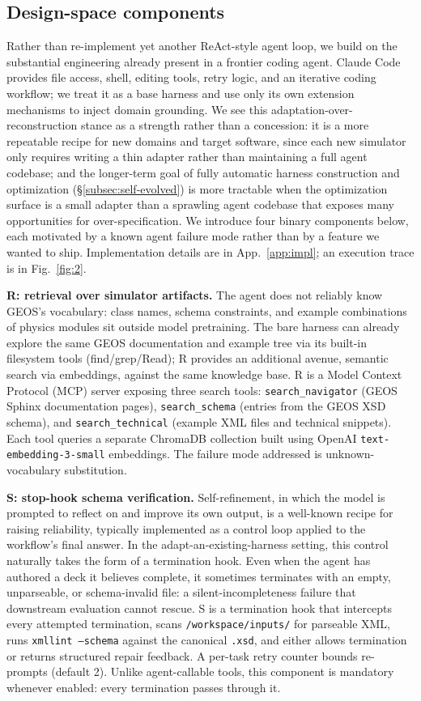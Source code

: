 \documentclass{article}
\begin{document}
\subsection{Design-space components}
\label{subsec:overview}

Rather than re-implement yet another ReAct-style agent loop, we build on the substantial engineering already present in a frontier coding agent. Claude Code provides file access, shell, editing tools, retry logic, and an iterative coding workflow; we treat it as a base harness and use only its own extension mechanisms to inject domain grounding. We see this adaptation-over-reconstruction stance as a strength rather than a concession: it is a more repeatable recipe for new domains and target software, since each new simulator only requires writing a thin adapter rather than maintaining a full agent codebase; and the longer-term goal of fully automatic harness construction and optimization (\S\ref{subsec:self-evolved}) is more tractable when the optimization surface is a small adapter than a sprawling agent codebase that exposes many opportunities for over-specification. We introduce four binary components below, each motivated by a known agent failure mode rather than by a feature we wanted to ship. Implementation details are in App.~\ref{app:impl}; an execution trace is in Fig.~\ref{fig:2}.

\textbf{R: retrieval over simulator artifacts.} The agent does not reliably know GEOS's vocabulary: class names, schema constraints, and example combinations of physics modules sit outside model pretraining. The bare harness can already explore the same GEOS documentation and example tree via its built-in filesystem tools (find/grep/Read); R provides an additional avenue, semantic search via embeddings, against the same knowledge base. R is a Model Context Protocol (MCP) server exposing three search tools: \texttt{search\_navigator} (GEOS Sphinx documentation pages), \texttt{search\_schema} (entries from the GEOS XSD schema), and \texttt{search\_technical} (example XML files and technical snippets). Each tool queries a separate ChromaDB collection built using OpenAI \texttt{text-embedding-3-small} embeddings. The failure mode addressed is unknown-vocabulary substitution.

\textbf{S: stop-hook schema verification.} Self-refinement, in which the model is prompted to reflect on and improve its own output, is a well-known recipe for raising reliability, typically implemented as a control loop applied to the workflow's final answer. In the adapt-an-existing-harness setting, this control naturally takes the form of a termination hook. Even when the agent has authored a deck it believes complete, it sometimes terminates with an empty, unparseable, or schema-invalid file: a silent-incompleteness failure that downstream evaluation cannot rescue. S is a termination hook that intercepts every attempted termination, scans \texttt{/workspace/inputs/} for parseable XML, runs \texttt{xmllint --schema} against the canonical \texttt{.xsd}, and either allows termination or returns structured repair feedback. A per-task retry counter bounds re-prompts (default 2). Unlike agent-callable tools, this component is mandatory whenever enabled: every termination passes through it.
\end{document}
